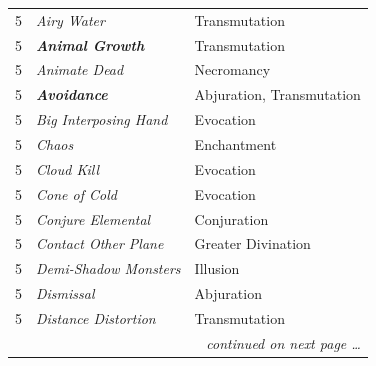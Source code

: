 \begin{multicols}{2}
\begin{tabular}{|p{}|p{}|p{}|}
5	& \textit{Airy Water}	& Transmutation \\
\rowcolor[gray]{.9}5	& \textbf{\textit{Animal Growth}}	& Transmutation \\
5	& \textit{Animate Dead}	& Necromancy \\
\rowcolor[gray]{.9}5	& \textbf{\textit{Avoidance}} & Abjuration, Transmutation \\
5	& \textit{Big Interposing Hand}	& Evocation \\
\rowcolor[gray]{.9}5	& \textit{Chaos}	& Enchantment \\
5	& \textit{Cloud Kill}	& Evocation \\
\rowcolor[gray]{.9}5	& \textit{Cone of Cold}	& Evocation \\
5	& \textit{Conjure Elemental}	& Conjuration \\
\rowcolor[gray]{.9}5	& \textit{Contact Other Plane}	& Greater Divination \\
5	& \textit{Demi-Shadow Monsters}	& Illusion \\
\rowcolor[gray]{.9}5	& \textit{Dismissal}	& Abjuration \\
5	& \textit{Distance Distortion}	&Transmutation \\
\hline
\multicolumn{3}{r}{\textit{continued on next page \ldots}} \\
\end{tabular}


\end{multicols}

